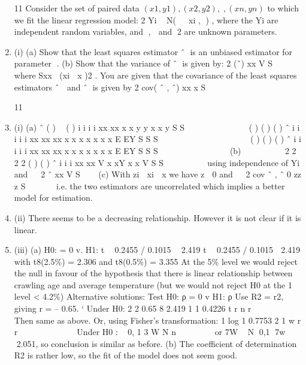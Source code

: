 \documentclass[a4paper,12pt]{article}
\begin{document}
\begin{enumerate}

11 Consider the set of paired data $(x1, y1), (x2 , y2 ),,(xn , yn )$ to which we fit the linear
regression model:
  2
Yi ~ N(  xi , ) ,
where the Yi are independent random variables, and ,  and 2 are unknown
parameters.
\item (i) (a) Show that the least squares estimator ˆ is an unbiased estimator for
parameter .
(b) Show that the variance of ˆ is given by:
  2
(ˆ)
xx
V
S

 
where Sxx (xi  x )2 .
You are given that the covariance of the least squares estimators ˆ  and ˆ is
given by
2
cov( ˆ , ˆ)
xx
x
S

11 \item (i) (a)
ˆ ( )  ( )
i i i i
xx xx
x x y y x x y
S S
  
    
    ( ) ( ) ( )
ˆ i i i i
i
xx xx xx
x x x x x x x
E EY
S S S
  
         
    ( ) ( ) ( )
ˆ i i i i
i
xx xx xx
x x x x x x x
E EY
S S S
  
         
(b)    
   
2 2
2 2
( ) ( )
ˆ i i i
xx xx
V x xY x x
V
S S
  
     using independence of Yi
and   2
ˆ
xx
V
S

 
(c) With zi  xi  x we have z  0 and   2
cov ˆ , ˆ 0
zz
z
S

   
i.e. the two estimators are uncorrelated which implies a better model for estimation.
\item (ii) There seems to be a decreasing relationship. However it is not clear if it is linear.
\item (iii) (a) H0: \beta = 0 v. H1: \beta {}
t  0.2455 / 0.1015  2.419 t  0.2455 / 0.1015  2.419
with t8(2.5\%) = 2.306 and t8(0.5\%) = 3.355
At the 5\% level we would reject the null in favour of the hypothesis that there is linear relationship between crawling age and average
temperature (but we would not reject H0 at the 1%
             level < 4.2\%)
Alternative solutions:
  Test H0: ρ = 0 v H1: ρ 
Use R2 = r2, giving r = – 0.65.
` Under H0:
  2
2 0.65 8 2.419
1 1 0.4226
t r n
r
 
  
 
Then same as above.
Or, using Fisher’s transformation:
  1 log 1 0.7753
2 1
w r
r
          
Under H0 :
  ~ 0, 1
3
W N
n
 
    
or 7W ~ N 0,1
7w  2.051, so conclusion is similar as before.
(b) The coefficient of determination R2 is rather low, so the fit of the
model does not seem good.

\end{enumerate}
\end{document}
